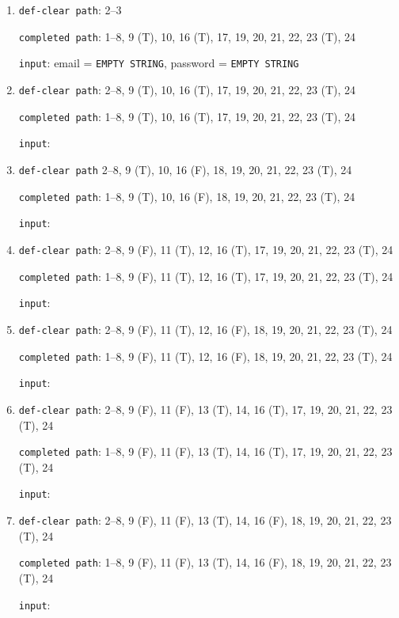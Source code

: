 \documentclass{article}
\begin{document}
\begin{enumerate}
    \item \texttt{def-clear path}: 2--3
          \par \texttt{completed path}: 1--8, 9 (T), 10, 16 (T), 17, 19, 20, 21, 22, 23 (T), 24
          \par \texttt{input}: email = \texttt{EMPTY STRING}, password = \texttt{EMPTY STRING}

    \item \texttt{def-clear path}: 2--8, 9 (T), 10, 16 (T), 17, 19, 20, 21, 22, 23 (T), 24
          \par \texttt{completed path}: 1--8, 9 (T), 10, 16 (T), 17, 19, 20, 21, 22, 23 (T), 24
          \par \texttt{input}:

    \item \texttt{def-clear path} 2--8, 9 (T), 10, 16 (F), 18, 19, 20, 21, 22, 23 (T), 24
          \par \texttt{completed path}: 1--8, 9 (T), 10, 16 (F), 18, 19, 20, 21, 22, 23 (T), 24
          \par \texttt{input}:

    \item \texttt{def-clear path}: 2--8, 9 (F), 11 (T), 12, 16 (T), 17, 19, 20, 21, 22, 23 (T), 24
          \par \texttt{completed path}: 1--8, 9 (F), 11 (T), 12, 16 (T), 17, 19, 20, 21, 22, 23 (T), 24
          \par \texttt{input}:

    \item \texttt{def-clear path}: 2--8, 9 (F), 11 (T), 12, 16 (F), 18, 19, 20, 21, 22, 23 (T), 24
          \par \texttt{completed path}: 1--8, 9 (F), 11 (T), 12, 16 (F), 18, 19, 20, 21, 22, 23 (T), 24
          \par \texttt{input}:

    \item \texttt{def-clear path}: 2--8, 9 (F), 11 (F), 13 (T), 14, 16 (T), 17, 19, 20, 21, 22, 23 (T), 24
          \par \texttt{completed path}: 1--8, 9 (F), 11 (F), 13 (T), 14, 16 (T), 17, 19, 20, 21, 22, 23 (T), 24
          \par \texttt{input}:

    \item \texttt{def-clear path}: 2--8, 9 (F), 11 (F), 13 (T), 14, 16 (F), 18, 19, 20, 21, 22, 23 (T), 24
          \par \texttt{completed path}: 1--8, 9 (F), 11 (F), 13 (T), 14, 16 (F), 18, 19, 20, 21, 22, 23 (T), 24
          \par \texttt{input}:


\end{enumerate}
\end{document}
